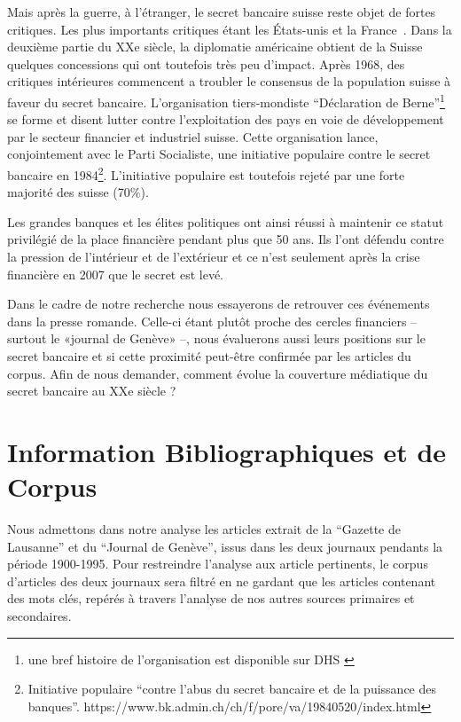 \documentclass[11pt]{article}
\begin{document}
Mais après la guerre, à l'étranger, le secret bancaire suisse reste objet de
fortes critiques. Les plus importants critiques étant les États-unis et la
France~\citep[p.503]{Mazbouri12}. Dans la deuxième partie du XXe siècle, la
diplomatie américaine obtient de la Suisse quelques concessions qui ont
toutefois très peu d'impact.  Après 1968, des critiques intérieures commencent
a troubler le consensus de la population suisse à faveur du secret bancaire.
L’organisation tiers-mondiste “Déclaration de Berne”\footnote{une bref histoire
de l'organisation est disponible sur DHS \citep{EvB}} se forme et disent lutter contre
l'exploitation des pays en voie de développement par le secteur financier et
industriel suisse. Cette organisation lance, conjointement avec le Parti
Socialiste, une initiative populaire contre le secret bancaire en
1984\footnote{Initiative populaire ``contre l'abus du secret bancaire et de la
puissance des banques''.
https://www.bk.admin.ch/ch/f/pore/va/19840520/index.html}. L'initiative
populaire est toutefois rejeté par une forte majorité des suisse (70\%).


Les grandes banques et les élites politiques ont ainsi réussi à maintenir ce
statut privilégié de la place financière pendant plus que 50 ans. Ils l’ont
défendu contre la pression de l’intérieur et de l’extérieur et ce n’est
seulement après la crise financière en 2007 que le secret est levé.

Dans le cadre de notre recherche nous essayerons de retrouver ces événements
dans la presse romande. Celle-ci étant plutôt proche des cercles financiers –
surtout le «journal de Genève» \citep{ConfClass1} –, nous évaluerons aussi
leurs positions sur le secret bancaire et si cette proximité peut-être
confirmée par les articles du corpus. Afin de nous demander, comment évolue la
couverture médiatique du secret bancaire au XXe siècle ? 

\section{Information Bibliographiques et de Corpus}
Nous admettons dans notre analyse les articles extrait de la “Gazette de
Lausanne” et du “Journal de Genève”, issus dans les deux journaux pendants la
période 1900-1995. Pour restreindre l’analyse aux article pertinents, le corpus
d’articles des deux journaux sera filtré en ne gardant que les articles
contenant des mots clés, repérés à travers l’analyse de nos autres sources
primaires et secondaires.
\end{document}

